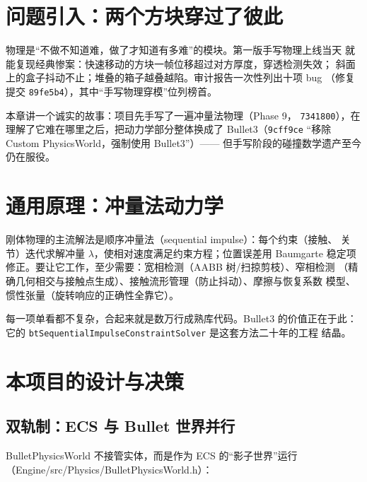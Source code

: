 \section{问题引入：两个方块穿过了彼此}

物理是``不做不知道难，做了才知道有多难''的模块。第一版手写物理上线当天
就能复现经典惨案：快速移动的方块一帧位移超过对方厚度，穿透检测失效；
斜面上的盒子抖动不止；堆叠的箱子越叠越陷。审计报告一次性列出十项 bug
（修复提交 \texttt{89fe5b4}），其中``手写物理穿模''位列榜首。

本章讲一个诚实的故事：项目先手写了一遍冲量法物理（Phase 9，
\texttt{7341800}），在理解了它难在哪里之后，把动力学部分整体换成了
Bullet3（\texttt{9cff9ce} ``移除 Custom PhysicsWorld，强制使用 Bullet3''）——
但手写阶段的碰撞数学遗产至今仍在服役。

\section{通用原理：冲量法动力学}

刚体物理的主流解法是顺序冲量法（sequential impulse）：每个约束（接触、
关节）迭代求解冲量 $\lambda$，使相对速度满足约束方程；位置误差用 Baumgarte
稳定项修正。要让它工作，至少需要：宽相检测（AABB 树/扫掠剪枝）、窄相检测
（精确几何相交与接触点生成）、接触流形管理（防止抖动）、摩擦与恢复系数
模型、惯性张量（旋转响应的正确性全靠它）。

每一项单看都不复杂，合起来就是数万行成熟库代码。Bullet3 的价值正在于此：
它的 \texttt{btSequentialImpulseConstraintSolver} 是这套方法二十年的工程
结晶。

\section{本项目的设计与决策}

\subsection{双轨制：ECS 与 Bullet 世界并行}

BulletPhysicsWorld 不接管实体，而是作为 ECS 的``影子世界''运行
（Engine/src/Physics/BulletPhysicsWorld.h）：

